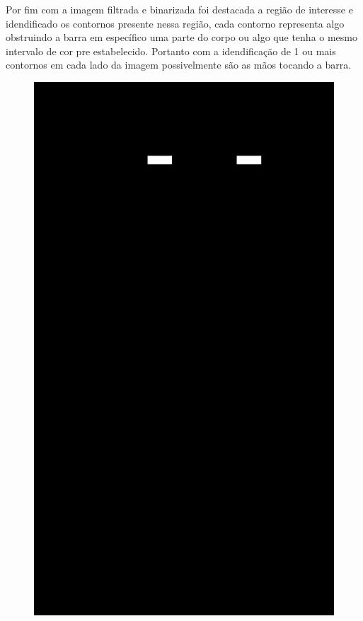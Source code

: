 Por fim com a imagem filtrada e binarizada foi destacada a região de interesse e idendificado os contornos presente nessa região, cada contorno representa algo obstruindo a barra em específico uma parte do corpo ou algo que tenha o mesmo intervalo de cor pre estabelecido. Portanto com a idendificação de 1 ou mais contornos em cada lado da imagem possivelmente são as mãos tocando a barra.

\begin{figure}[!htbp]
    \centering
        \begin{minipage}{\sizeImg\textwidth}
            \includegraphics[width=\textwidth]{figuras/mao_barra/only_hands.png}

\end{minipage}
\end{figure}
